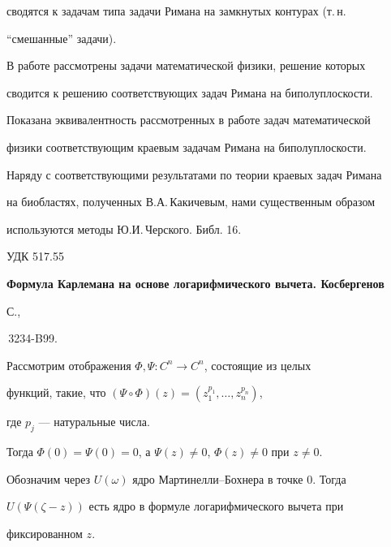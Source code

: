 сводятся к задачам типа задачи Римана на замкнутых контурах (т.\,н. 


``смешанные'' задачи). 


 


В работе рассмотрены задачи математической физики, решение которых 


сводится к решению соответствующих задач Римана на биполуплоскости. 


Показана эквивалентность рассмотренных в работе задач математической 


физики соответствующим краевым задачам Римана на биполуплоскости. 


 


Наряду с соответствующими результатами по теории краевых задач Римана 


на биобластях, полученных В.А.\,Какичевым, нами существенным образом 


используются методы Ю.И.\,Черского. Библ. 16. 


\bigskip 


 


 


{\hfill {УДК 517.55}} 


 


{\bf Формула Карлемана на основе логарифмического вычета. Косбергенов 


С., 


\No\,3234-B99.} 


\medskip 


 


Рассмотрим отображения $\Phi,\Psi:C^n\to C^n$, состоящие из целых 


функций, такие, что $(\Psi\circ\Phi)(z)=(z^{p_1}_1,\dotsc,z^{p_n}_n)$, 


где $p_j$ --- натуральные числа. 


 


Тогда $\Phi(0)=\Psi(0)=0$, а $\Psi(z)\ne0$, $\Phi(z)\ne0$ при $z\ne0$. 


Обозначим через $U(\omega)$ ядро Мартинелли--Бохнера в точке 0. Тогда 


$U(\Psi(\zeta-z))$ есть ядро в формуле логарифмического вычета при 


фиксированном $z$. 


